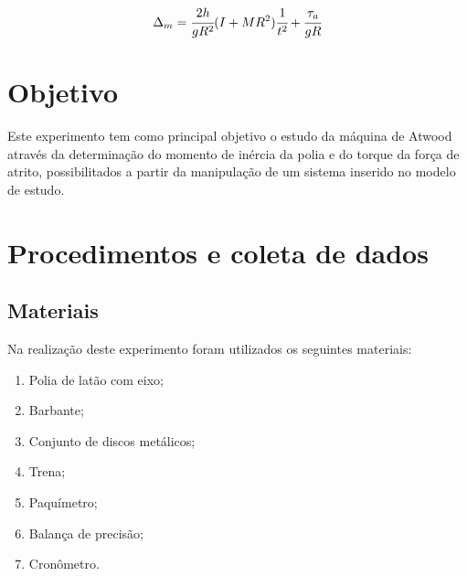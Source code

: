 \documentclass[a4paper]{article}
\begin{document}
\begin{align}
\Delta_m=\cfrac{2h}{gR^{2}}(I+MR^{2})\ensuremath{\cfrac{1}{t^{2}}}+\cfrac{\tau_{a}}{gR}
\end{align}


\section{Objetivo}
Este experimento tem como principal objetivo o estudo da máquina de Atwood através da determinação do momento de inércia da polia e do torque da força de atrito, possibilitados a partir da manipulação de um sistema inserido no modelo de estudo.


\section{Procedimentos e coleta de dados}
\subsection{Materiais}
Na realização deste experimento foram utilizados os seguintes materiais: 
\begin{enumerate} 
	\item Polia de latão com eixo;
	\item Barbante;
	\item Conjunto de discos metálicos;
	\item Trena;
	\item Paquímetro;
	\item Balança de precisão;
	\item Cronômetro.
 \end {enumerate} 
\end{document}
